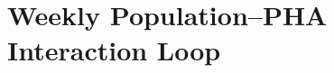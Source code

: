 \documentclass[sigconf,review]{acmart}
\begin{document}
\section{Weekly Population--PHA Interaction Loop}
\label{supp:weekly-loop}




\end{document}
